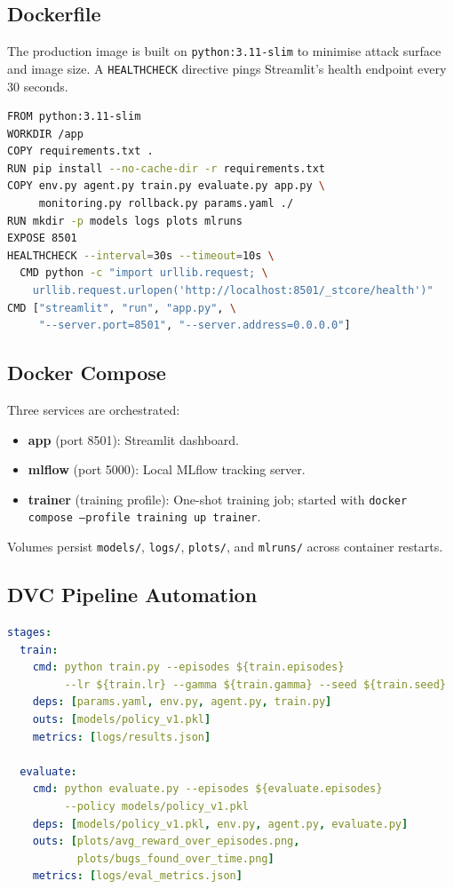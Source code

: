 \documentclass[12pt,a4paper]{report}
\begin{document}
\subsection{Dockerfile}

The production image is built on \texttt{python:3.11-slim} to minimise
attack surface and image size.  A \texttt{HEALTHCHECK} directive pings
Streamlit's health endpoint every 30 seconds.

\begin{lstlisting}[language=sh, caption={Dockerfile excerpt.}]
FROM python:3.11-slim
WORKDIR /app
COPY requirements.txt .
RUN pip install --no-cache-dir -r requirements.txt
COPY env.py agent.py train.py evaluate.py app.py \
     monitoring.py rollback.py params.yaml ./
RUN mkdir -p models logs plots mlruns
EXPOSE 8501
HEALTHCHECK --interval=30s --timeout=10s \
  CMD python -c "import urllib.request; \
    urllib.request.urlopen('http://localhost:8501/_stcore/health')"
CMD ["streamlit", "run", "app.py", \
     "--server.port=8501", "--server.address=0.0.0.0"]
\end{lstlisting}

\subsection{Docker Compose}

Three services are orchestrated:

\begin{itemize}[leftmargin=1.5em]
  \item \textbf{app} (port 8501): Streamlit dashboard.
  \item \textbf{mlflow} (port 5000): Local MLflow tracking server.
  \item \textbf{trainer} (training profile): One-shot training job;
        started with \texttt{docker compose --profile training up trainer}.
\end{itemize}

Volumes persist \texttt{models/}, \texttt{logs/}, \texttt{plots/}, and
\texttt{mlruns/} across container restarts.

\subsection{DVC Pipeline Automation}

\begin{lstlisting}[language=yaml, caption={dvc.yaml pipeline definition.}]
stages:
  train:
    cmd: python train.py --episodes ${train.episodes}
         --lr ${train.lr} --gamma ${train.gamma} --seed ${train.seed}
    deps: [params.yaml, env.py, agent.py, train.py]
    outs: [models/policy_v1.pkl]
    metrics: [logs/results.json]

  evaluate:
    cmd: python evaluate.py --episodes ${evaluate.episodes}
         --policy models/policy_v1.pkl
    deps: [models/policy_v1.pkl, env.py, agent.py, evaluate.py]
    outs: [plots/avg_reward_over_episodes.png,
           plots/bugs_found_over_time.png]
    metrics: [logs/eval_metrics.json]
\end{lstlisting}
\end{document}
